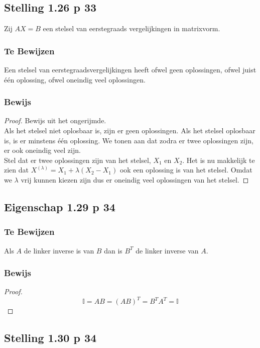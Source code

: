 \documentclass[lineaire_algebra_oplossingen.tex]{subfiles}
\begin{document}
\subsection{Stelling 1.26 p 33}
\label{1.26}
Zij $AX=B$ een stelsel van eerstegraads vergelijkingen in matrixvorm.

\subsubsection*{Te Bewijzen}
Een stelsel van eerstegraadsvergelijkingen heeft ofwel geen oplossingen, ofwel juist \'e\'en oplossing, ofwel oneindig veel oplossingen.

\subsubsection*{Bewijs}
\begin{proof}
Bewijs uit het ongerijmde.\\
Als het stelsel niet oplosbaar is, zijn er geen oplossingen. Als het stelsel oplosbaar is, is er minstens \'e\'en oplossing. We tonen aan dat zodra er twee oplossingen zijn, er ook oneindig veel zijn.\\
Stel dat er twee oplossingen zijn van het stelsel, $X_1$ en $X_2$. Het is nu makkelijk te zien dat $X^{(\lambda)} = X_1 + \lambda(X_2-X_1)$ ook een oplossing is van het stelsel. Omdat we $\lambda$ vrij kunnen kiezen zijn dus er oneindig veel oplossingen van het stelsel.
\end{proof}


\subsection{Eigenschap 1.29 p 34}
\label{1.29}
\subsubsection*{Te Bewijzen}
Als $A$ de linker inverse is van $B$ dan is $B^T$ de linker inverse van $A$.

\subsubsection*{Bewijs}
\begin{proof}
\[\mathbb{I} = AB= (AB)^T = B^TA^T = \mathbb{I}\]
\end{proof}


\subsection{Stelling 1.30 p 34}
\end{document}

